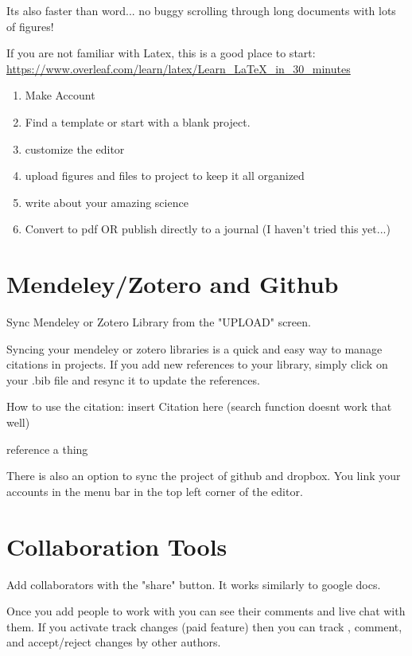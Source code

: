\documentclass[draft]{agujournal2019}
\begin{document}
Its also faster than word... no buggy scrolling through long documents with lots of figures!


If you are not familiar with Latex, this is a good place to start: \url{https://www.overleaf.com/learn/latex/Learn_LaTeX_in_30_minutes}
\begin{enumerate}
  \item Make Account
  \item Find a template or start with a blank project.
  \item customize the editor
  \item upload figures and files to project to keep it all organized
  \item write about your amazing science
  \item Convert to pdf OR publish directly to a journal (I haven't tried this yet...)
\end{enumerate}
\clearpage


\section{Mendeley/Zotero and Github}

Sync Mendeley or Zotero Library from the "UPLOAD" screen.


Syncing your mendeley or zotero libraries is a quick and easy way to manage citations in projects. If you add new references to your library, simply click on your .bib file and resync it to update the references.  


How to use the citation: \cite{Zou2017ObservedAtlanticc} insert Citation here (search function doesnt work that well)

reference a thing \cite{Johns2019Registration:,}

There is also an option to sync the project of github and dropbox. You link your accounts in the menu bar in the top left corner of the editor.
%
\clearpage


\clearpage

\section{Collaboration Tools}
Add collaborators with the "share" button. It works similarly to google docs. 


Once you add people to work with you can see their comments and live chat with them. If you activate track changes (paid feature) then you can track , comment, and accept/reject changes by other authors.
\clearpage
\end{document}

